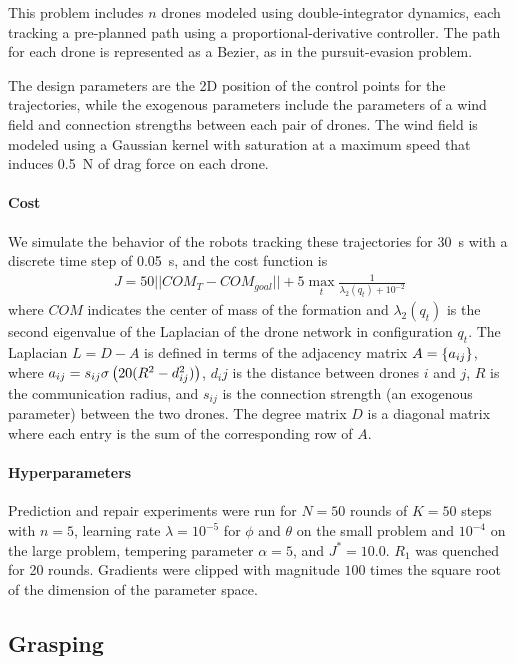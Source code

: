 This problem includes $n$ drones modeled using double-integrator dynamics, each tracking a pre-planned path using a proportional-derivative controller. The path for each drone is represented as a Bezier, as in the pursuit-evasion problem.

The design parameters are the 2D position of the control points for the trajectories, while the exogenous parameters include the parameters of a wind field and connection strengths between each pair of drones. The wind field is modeled using a Gaussian kernel with saturation at a maximum speed that induces \SI{0.5}{N} of drag force on each drone.

\paragraph{Cost} We simulate the behavior of the robots tracking these trajectories for \SI{30}{s} with a discrete time step of \SI{0.05}{s}, and the cost function is
\begin{align*}
    J = 50 ||COM_T - COM_{goal}|| + 5 \max_{t} \frac{1}{\lambda_2(q_t) + 10^{-2}}
\end{align*}
%
where $COM$ indicates the center of mass of the formation and $\lambda_2(q_t)$ is the second eigenvalue of the Laplacian of the drone network in configuration $q_t$. The Laplacian $L = D - A$ is defined in terms of the adjacency matrix $A = \left\{a_{ij}\right\}$, where $a_{ij} = s_{ij}\sigma\left( 20 (R^2 - d_{ij}^2) \right)$, $d_ij$ is the distance between drones $i$ and $j$, $R$ is the communication radius, and $s_{ij}$ is the connection strength (an exogenous parameter) between the two drones. The degree matrix $D$ is a diagonal matrix where each entry is the sum of the corresponding row of $A$.

\paragraph{Hyperparameters} Prediction and repair experiments were run for $N=50$ rounds of $K=50$ steps with $n=5$, learning rate $\lambda = 10^{-5}$ for $\phi$ and $\theta$ on the small problem and $10^{-4}$ on the large problem, tempering parameter $\alpha = 5$, and $J^* = 10.0$.  $R_1$ was quenched for 20 rounds. Gradients were clipped with magnitude $100$ times the square root of the dimension of the parameter space.

\subsection{Grasping}

